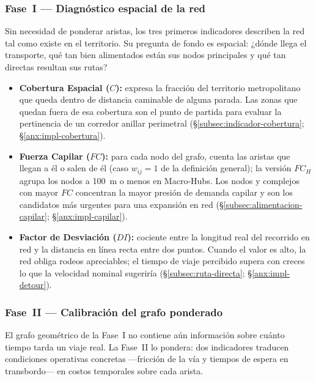 \subsubsection*{Fase~I — Diagnóstico espacial de la red}

Sin necesidad de ponderar aristas, los tres primeros indicadores describen la
red tal como existe en el territorio. Su pregunta de fondo es espacial: ¿dónde
llega el transporte, qué tan bien alimentados están sus nodos principales y qué
tan directas resultan sus rutas?

\begin{itemize}
    \item \textbf{Cobertura Espacial ($C$):} expresa la fracción del territorio
    metropolitano que queda dentro de distancia caminable de alguna parada.
    Las zonas que quedan fuera de esa cobertura son el punto de partida para
    evaluar la pertinencia de un corredor anillar perimetral
    (§\ref{subsec:indicador-cobertura}; §\ref{anx:impl-cobertura}).

    \item \textbf{Fuerza Capilar ($FC$):} para cada nodo del grafo, cuenta las
    aristas que llegan a él o salen de él (caso $w_{ij} = 1$ de la definición
    general); la versión $FC_H$ agrupa los nodos a 100~m o menos en
    Macro-Hubs. Los nodos y complejos con mayor $FC$ concentran la mayor
    presión de demanda capilar y son los candidatos más urgentes para una
    expansión en red (§\ref{subsec:alimentacion-capilar}; §\ref{anx:impl-capilar}).

    \item \textbf{Factor de Desviación ($DI$):} cociente entre la longitud
    real del recorrido en red y la distancia en línea recta entre dos puntos.
    Cuando el valor es alto, la red obliga rodeos apreciables; el tiempo de
    viaje percibido supera con creces lo que la velocidad nominal sugeriría
    (§\ref{subsec:ruta-directa}; §\ref{anx:impl-detour}).
\end{itemize}

\subsubsection*{Fase~II — Calibración del grafo ponderado}

El grafo geométrico de la Fase~I no contiene aún información sobre cuánto tiempo
tarda un viaje real. La Fase~II lo pondera: dos indicadores traducen condiciones
operativas concretas —fricción de la vía y tiempos de espera en transbordo— en
costos temporales sobre cada arista.

